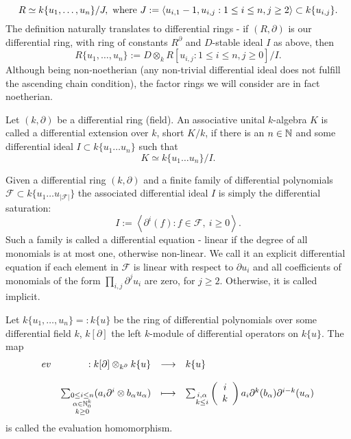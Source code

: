 $$R \simeq k\{u_1,\ldots,u_n\}/J,\ \trm{where}\ J := \left<u_{i,1} - 1, u_{i,j} : 1 \leq i \leq n, j \geq 2\right> \subset k\{u_{i,j}\}.$$
\indent The definition naturally translates to differential rings - if $(R,\partial)$ is our differential ring, with ring of constants $R^\partial$ and $D$-stable ideal $I$ as above, then
$$R\{u_1,\ldots,u_n\} := D \otimes_k R[u_{i,j} : 1 \leq i \leq n, j \geq 0]/I.$$
Although being non-noetherian (any non-trivial differential ideal does not fulfill the ascending chain condition), the factor rings we will consider are in fact noetherian.
\begin{defi}
Let $(k,\partial)$ be a differential ring (field). An associative unital $k$-algebra $K$ is called a differential extension over $k$, short $K/k$, if there is an $n \in \nz$ and some differential ideal $I \subset k\{u_1\ldots u_n\}$ such that
$$K \simeq k\{u_1\ldots u_n\}/I.$$
\end{defi}
\bmk Given a differential ring $(k,\partial)$ and a finite family of differential polynomials $\mathcal{F} \subset k\{u_1\ldots u_{|\mathcal{F}|}\}$ the associated differential ideal $I$ is simply the differential saturation:
$$I := \left<\partial^i(f) : f \in \mathcal{F},\ i \geq 0\right>.$$
Such a family is called a differential equation - linear if the degree of all monomials is at most one, otherwise non-linear. We call it an explicit differential equation if each element in $\mathcal{F}$ is linear with respect to $\partial u_i$ and all coefficients of monomials of the form $\prod_{i,j} \partial^j u_i$ are zero, for $j \geq 2$. Otherwise, it is called implicit.
\begin{defi}
Let $k\{u_1,\hdots,u_n\} =: k\{u\}$ be the ring of differential polynomials over some differential field $k$, $k[\partial]$ the left $k$-module of differential operators on $k\{u\}$. The map
$$\bao{rrcl}
ev &: k[\partial] \otimes_{k^\partial} k\{u\} & \longrightarrow &k\{u\}\\
&&&\\
& \sum_{\substack{0 \leq i \leq n\\\alpha \in \nz_0^k\\k\geq 0}} (a_i \partial^i \otimes b_\alpha u_\alpha) &\longmapsto& \sum_{\substack{i,\alpha\\k \leq i}} \left(\bao{c}i\\k\\\ea\right) a_i \partial^k(b_\alpha) \partial^{i-k}(u_\alpha)\\
\ea$$
is called the evaluation homomorphism.
\end{defi}
